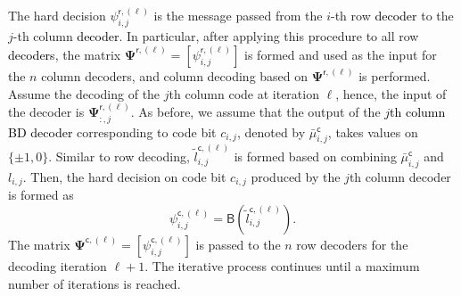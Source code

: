 \documentclass[journal]{IEEEtran}
\newcommand{\nc}{n}
\newcommand{\BB}{\mathsf{B}}
\newcommand{\AG}{\textcolor{black}}
\begin{document}
The hard decision $\psi_{i,j}^{\mathsf{r},(\ell)}$ is the message
passed from the $i$-th row \AG{decoder} to the $j$-th column \AG{decoder}. In
particular, after applying this procedure to all row \AG{decoders}, the matrix
$\boldsymbol{\Psi}^{\mathsf{r},(\ell)}=[\psi_{i,j}^{\mathsf{r},(\ell)}]$
is formed and used as the input for the $n$ column decoders, and column decoding based on
$\boldsymbol{\Psi}^{\mathsf{r},(\ell)}$ is performed. Assume the decoding of the $j$th column code at iteration $\ell$, hence, the input of the decoder is $\bm{\Psi}^{\mathsf{r},(\ell)}_{:,j}$. As before, we assume that the output of the \AG{$j$th column BD decoder} corresponding to code bit $c_{i,j}$, denoted by $\bar\mu_{i,j}^{\mathsf c}$, takes values on $\{\pm1, 0 \}$.  Similar to row decoding, $\tilde{l}_{i,j}^{\mathsf c, (\ell)}$ is formed based on combining  $\bar\mu_{i,j}^{\mathsf c}$ and $l_{i,j}$. Then, the hard decision on code bit $c_{i,j}$ produced by the $j$th column decoder is formed as 
\begin{equation}\label{eq:BDDchrel_VN_scale}
	\psi_{i,j}^{\mathsf{c},(\ell)}=\BB(\tilde{l}_{i,j}^{\mathsf c, (\ell)}).
\end{equation}
The matrix $\bm{\Psi}^{\mathsf{c},(\ell)}=[\psi_{i,j}^{\mathsf{c},(\ell)}]$ is passed to the $\nc$ row decoders for the decoding iteration $\ell+1$.
The iterative process continues until a maximum number of iterations is reached. 
\end{document}
